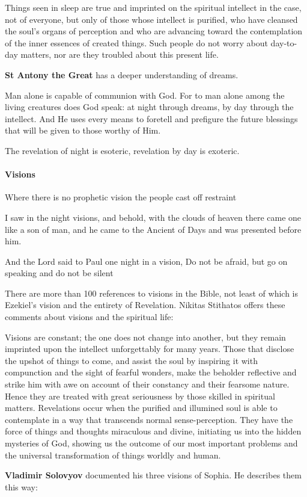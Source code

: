 \begin{quotex}
Things seen in sleep are true and imprinted on the spiritual intellect in the case, not of everyone, but only of those whose intellect is purified, who have cleansed the soul's organs of perception and who are advancing toward the contemplation of the inner essences of created things. Such people do not worry about day-to-day matters, nor are they troubled about this present life. 

\end{quotex}
\textbf{St Antony the Great} has a deeper understanding of dreams.

\begin{quotex}
Man alone is capable of communion with God. For to man alone among the living creatures does God speak: at night through dreams, by day through the intellect. And He uses every means to foretell and prefigure the future blessings that will be given to those worthy of Him. 

\end{quotex}
The revelation of night is esoteric, revelation by day is exoteric.

\paragraph{Visions}
\begin{quotex}
Where there is no prophetic vision the people cast off restraint 

I saw in the night visions, and behold, with the clouds of heaven there came one like a son of man, and he came to the Ancient of Days and was presented before him. 

And the Lord said to Paul one night in a vision, Do not be afraid, but go on speaking and do not be silent 

\end{quotex}
There are more than 100 references to visions in the Bible, not least of which is Ezekiel's vision and the entirety of Revelation. Nikitas Stithatos offers these comments about visions and the spiritual life:

\begin{quotex}
Visions are constant; the one does not change into another, but they remain imprinted upon the intellect unforgettably for many years. Those that disclose the upshot of things to come, and assist the soul by inspiring it with compunction and the sight of fearful wonders, make the beholder reflective and strike him with awe on account of their constancy and their fearsome nature. Hence they are treated with great seriousness by those skilled in spiritual matters. Revelations occur when the purified and illumined soul is able to contemplate in a way that transcends normal sense-perception. They have the force of things and thoughts miraculous and divine, initiating us into the hidden mysteries of God, showing us the outcome of our most important problems and the universal transformation of things worldly and human. 

\end{quotex}
\textbf{Vladimir Solovyov} documented his three visions of Sophia. He describes them this way:

